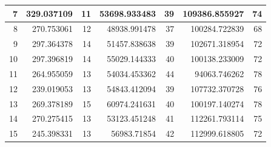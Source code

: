 \begin{table}
\begin{adjustwidth}{}{}
{{\begin{tabular}{|r|r|r|r|r|r|r|}
					\hline
					7                                          & 329.037109                   & 11                                    & 53698.933483                   & 39                                    & 109386.855927                & 74                                     \\ 
					\hline
					8                                          & 270.753061                   & 12                                    & 48938.991478                   & 37                                    & 100284.722839                & 68                                     \\ 
					\hline
					9                                          & 297.364378                   & 14                                    & 51457.838638                   & 39                                    & 102671.318954                & 72                                     \\ 
					\hline
					10                                         & 297.396819                   & 14                                    & 55029.144333                   & 40                                    & 100138.233009                & 72                                     \\ 
					\hline
					11                                         & 264.955059                   & 13                                    & 54034.453362                   & 44                                    & 94063.746262                 & 78                                     \\ 
					\hline
					12                                         & 239.019053                   & 13                                    & 54843.412094                   & 39                                    & 107732.370728                & 76                                     \\ 
					\hline
					13                                         & 269.378189                   & 15                                    & 60974.241631                   & 40                                    & 100197.140274                & 78                                     \\ 
					\hline
					14                                         & 270.275415                   & 13                                    & 53123.451248                   & 41                                    & 112261.793114                & 75                                     \\ 
					\hline
					15                                         & 245.398331                   & 13                                    & 56983.71854                    & 42                                    & 112999.618805                & 72                                     \\ 

\end{tabular}}}
\end{adjustwidth}
\end{table}
